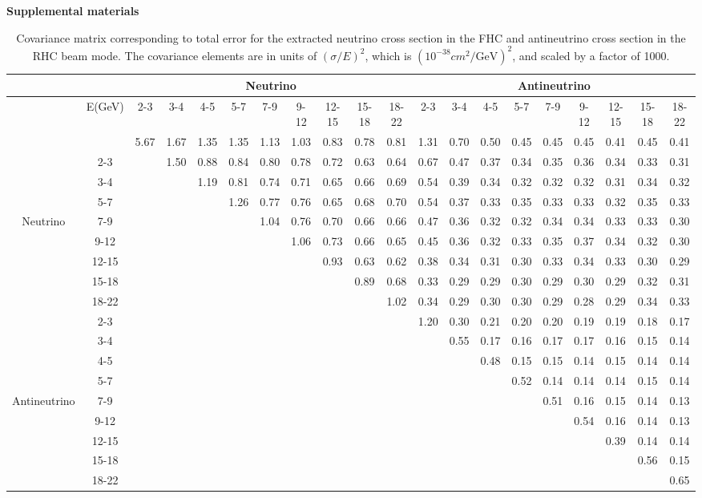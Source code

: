 \newpage

\onecolumngrid
\newpage
\centerline{\textbf{\Large Supplemental materials}  }

\begin{table}
\begin{centering}
\begin{tabular}{|c|c|c c c c c c c c c|c c c c c c c c c|}
\hline
& & \multicolumn{9}{c|}{Neutrino} &\multicolumn{9}{c|}{ Antineutrino}\\\hline
&E(GeV)&2-3&3-4&4-5&5-7&7-9&9-12&12-15&15-18&18-22&2-3&3-4&4-5&5-7&7-9&9-12&12-15&15-18&18-22\\\hline
&&5.67&1.67&1.35&1.35&1.13&1.03&0.83&0.78&0.81&1.31&0.70&0.50&0.45&0.45&0.45&0.41&0.45&0.41\\
&2-3& &1.50&0.88&0.84&0.80&0.78&0.72&0.63&0.64&0.67&0.47&0.37&0.34&0.35&0.36&0.34&0.33&0.31\\
&3-4& & &1.19&0.81&0.74&0.71&0.65&0.66&0.69&0.54&0.39&0.34&0.32&0.32&0.32&0.31&0.34&0.32\\
&5-7& & & &1.26&0.77&0.76&0.65&0.68&0.70&0.54&0.37&0.33&0.35&0.33&0.33&0.32&0.35&0.33\\
Neutrino&7-9& & & & &1.04&0.76&0.70&0.66&0.66&0.47&0.36&0.32&0.32&0.34&0.34&0.33&0.33&0.30\\
&9-12& & & & & &1.06&0.73&0.66&0.65&0.45&0.36&0.32&0.33&0.35&0.37&0.34&0.32&0.30\\
&12-15& & & & & & &0.93&0.63&0.62&0.38&0.34&0.31&0.30&0.33&0.34&0.33&0.30&0.29\\
&15-18& & & & & & & &0.89&0.68&0.33&0.29&0.29&0.30&0.29&0.30&0.29&0.32&0.31\\
&18-22& & & & & & & & &1.02&0.34&0.29&0.30&0.30&0.29&0.28&0.29&0.34&0.33\\\hline
&2-3& & & & & & & & & &1.20&0.30&0.21&0.20&0.20&0.19&0.19&0.18&0.17\\
&3-4& & & & & & & & & & &0.55&0.17&0.16&0.17&0.17&0.16&0.15&0.14\\
&4-5& & & & & & & & & & & &0.48&0.15&0.15&0.14&0.15&0.14&0.14\\
&5-7& & & & & & & & & & & & &0.52&0.14&0.14&0.14&0.15&0.14\\
Antineutrino&7-9& & & & & & & & & & & & & &0.51&0.16&0.15&0.14&0.13\\
&9-12& & & & & & & & & & & & & & &0.54&0.16&0.14&0.13\\
&12-15& & & & & & & & & & & & & & & &0.39&0.14&0.14\\
&15-18& & & & & & & & & & & & & & & & &0.56&0.15\\
&18-22& & & & & & & & & & & & & & & & & &0.65\\
\hline
\end{tabular}
\caption{Covariance matrix corresponding to total error for the extracted neutrino cross section in the FHC and antineutrino cross section in the RHC beam mode. The covariance elements are in units of $(\sigma/E)^{2}$, which is $(10^{-38} cm^{2} / \textrm{GeV} )^{2}$, and scaled by a factor of 1000. }
\label{app:xsec_cov}
\end{centering}
\end{table}


